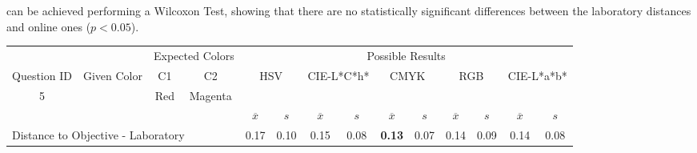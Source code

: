 can be achieved performing a Wilcoxon Test, showing that there are no statistically significant differences between the laboratory distances and online ones ($p < 0.05$).
%
\begin{table}[H]
  \resizebox{\textwidth}{!} {
  \begin{tabular}{lccccccccccccc}
    \hline
    \multicolumn{1}{c}{}                              &                                      & \multicolumn{2}{c}{Expected Colors}                   & \multicolumn{10}{c}{Possible Results}                                                                                                                                                                                                                                                                                        \\ \cline{3-14}
    \multicolumn{1}{c}{\multirow{-2}{*}{Question ID}} & \multirow{-2}{*}{Given Color}        & C1                       & C2                         & \multicolumn{2}{c}{HSV}                                        & \multicolumn{2}{c}{CIE-L*C*h*}                                 & \multicolumn{2}{c}{CMYK}                                       & \multicolumn{2}{c}{RGB}                                        & \multicolumn{2}{c}{CIE-L*a*b*}                                 \\ \hline
    \multicolumn{1}{c}{5}                             & \cellcolor[HTML]{FF0080}{\color[HTML]{FFFFFF}(45, 23, 22)} & \multicolumn{1}{c|}{Red} & \multicolumn{1}{c|}{Magenta}  & \multicolumn{2}{c|}{\cellcolor[HTML]{FF0080}{\color[HTML]{FFFFFF}(45, 23, 22)}}      & \multicolumn{2}{c|}{\cellcolor[HTML]{FF0080}{\color[HTML]{FFFFFF}(45, 23, 22)}}       & \multicolumn{2}{c|}{\cellcolor[HTML]{FF0080}{\color[HTML]{FFFFFF}(45, 23, 22)}}       & \multicolumn{2}{c|}{\cellcolor[HTML]{FF0080}{\color[HTML]{FFFFFF}(45, 23, 22)}}       & \multicolumn{2}{c|}{\cellcolor[HTML]{FF0087}{\color[HTML]{FFFFFF}(45, 23, 25)}}       \\ \hline
                                                      & \multicolumn{1}{l}{}                 & \multicolumn{1}{l}{}     & \multicolumn{1}{l}{}       & \multicolumn{1}{c}{$\overline{x}$} & \multicolumn{1}{c}{$s$} & \multicolumn{1}{c}{$\overline{x}$} & \multicolumn{1}{c}{$s$} & \multicolumn{1}{c}{$\overline{x}$} & \multicolumn{1}{c}{$s$} & \multicolumn{1}{c}{$\overline{x}$} & \multicolumn{1}{c}{$s$} & \multicolumn{1}{c}{$\overline{x}$} & \multicolumn{1}{c}{$s$} \\ \hline
    \multicolumn{4}{l}{Distance to Objective - Laboratory}                                                                                           & \multicolumn{1}{|c}{0.17}       & \multicolumn{1}{c|}{0.10}    & \multicolumn{1}{|c}{0.15}       & \multicolumn{1}{c|}{0.08}    & \multicolumn{1}{|c}{\textbf{0.13}}       & \multicolumn{1}{c|}{0.07}    & \multicolumn{1}{|c}{0.14}       & \multicolumn{1}{c|}{0.09}    & \multicolumn{1}{|c}{0.14}       & \multicolumn{1}{c|}{0.08}    \\

\end{tabular}}
\end{table}
